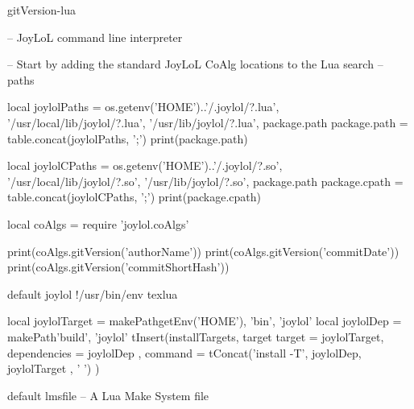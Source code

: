 
\startchapter[title=Preamble]


\component gitVersion-lua

\startLuaCode
-- JoyLoL command line interpreter 

-- Start by adding the standard JoyLoL CoAlg locations to the Lua search 
-- paths 

local joylolPaths = {
  os.getenv('HOME')..'/.joylol/?.lua',
  '/usr/local/lib/joylol/?.lua',
  '/usr/lib/joylol/?.lua',
  package.path
}
package.path = table.concat(joylolPaths, ';')
print(package.path)

local joylolCPaths = {
  os.getenv('HOME')..'/.joylol/?.so',
  '/usr/local/lib/joylol/?.so',
  '/usr/lib/joylol/?.so',
  package.path
}
package.cpath = table.concat(joylolCPaths, ';')
print(package.cpath)

local coAlgs = require 'joylol.coAlgs'

print(coAlgs.gitVersion('authorName'))
print(coAlgs.gitVersion('commitDate'))
print(coAlgs.gitVersion('commitShortHash'))
\stopLuaCode


\createLuaCodeFile%
  {default}%
  {joylol}%
  {!/usr/bin/env texlua}



\startLmsfile
local joylolTarget = makePath{getEnv('HOME'), 'bin', 'joylol'}
local joylolDep    = makePath{'build', 'joylol'}
tInsert(installTargets, target{
  target       = joylolTarget,
  dependencies = { joylolDep },
  command      = tConcat({'install -T', joylolDep, joylolTarget }, ' ')
})
\stopLmsfile


\createLmsfileFile%
  {default}%
  {lmsfile}%
  {-- A Lua Make System file}

\stopchapter